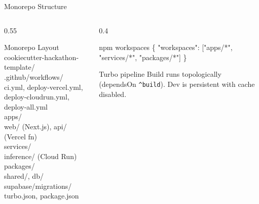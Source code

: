 \documentclass[10pt,aspectratio=169,t]{beamer}
\begin{document}
\begin{frame}{Monorepo Structure}

  \begin{columns}

    \begin{column}{0.55\paperwidth}

      \begin{block}{Monorepo Layout}
        \ttfamily\scriptsize
        cookiecutter-hackathon-template/\\
        \hspace{1em}.github/workflows/\\
        \hspace{2em}ci.yml, deploy-vercel.yml,\\
        \hspace{2em}deploy-cloudrun.yml, deploy-all.yml\\
        \hspace{1em}apps/\\
        \hspace{2em}web/ (Next.js), api/ (Vercel fn)\\
        \hspace{1em}services/\\
        \hspace{2em}inference/ (Cloud Run)\\
        \hspace{1em}packages/\\
        \hspace{2em}shared/, db/\\
        \hspace{1em}supabase/migrations/\\
        \hspace{1em}turbo.json, package.json
      \end{block}

    \end{column}

    \begin{column}{0.4\paperwidth}

      \begin{block}{npm workspaces}
        \ttfamily\scriptsize
        \{ "workspaces": ["apps/*", "services/*", "packages/*"] \}
      \end{block}

      \begin{block}{Turbo pipeline}
        Build runs topologically (dependsOn \texttt{\string^build}). Dev is persistent with cache disabled.
      \end{block}


\end{column}
\end{columns}
\end{frame}
\end{document}
